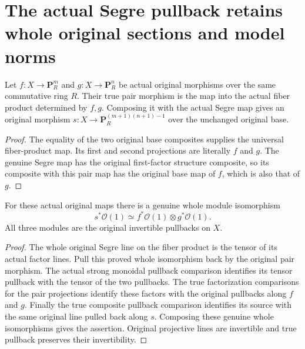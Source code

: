 \section{The actual Segre pullback retains whole original sections and model norms}
\label{sec:projective-segre-pullback-sections}

\begin{definition}
\label{def:original-pair-segre-morphism}
\leanok
Let $f:X\to\mathbf P_R^m$ and $g:X\to\mathbf P_R^n$ be actual
original morphisms over the same commutative ring $R$. Their true pair
morphism is the map into the actual fiber product determined by $f,g$.
Composing it with the actual Segre map gives an original morphism
$s:X\to\mathbf P_R^{(m+1)(n+1)-1}$ over the unchanged original base.
\end{definition}
\begin{proof}
The equality of the two original base composites supplies the universal
fiber-product map. Its first and second projections are literally $f$
and $g$. The genuine Segre map has the original first-factor structure
composite, so its composite with this pair map has the original base map
of $f$, which is also that of $g$.
\end{proof}

\begin{theorem}
\label{thm:original-segre-pulled-line-iso}
\leanok
{}
For these actual original maps there is a genuine whole module
isomorphism
\[
 s^*\mathcal O(1)\simeq f^*\mathcal O(1)\otimes g^*\mathcal O(1).
\]
All three modules are the original invertible pullbacks on $X$.
\end{theorem}
\begin{proof}
The whole original Segre line on the fiber product is the tensor of its
actual factor lines. Pull this proved whole isomorphism back by the
original pair morphism. The actual strong monoidal pullback comparison
identifies its tensor pullback with the tensor of the two pullbacks.
The true factorization comparisons for the pair projections identify
these factors with the original pullbacks along $f$ and $g$. Finally the
true composite pullback comparison identifies its source with the same
original line pulled back along $s$. Composing these genuine whole
isomorphisms gives the assertion. Original projective lines are
invertible and true pullback preserves their invertibility.
\end{proof}

